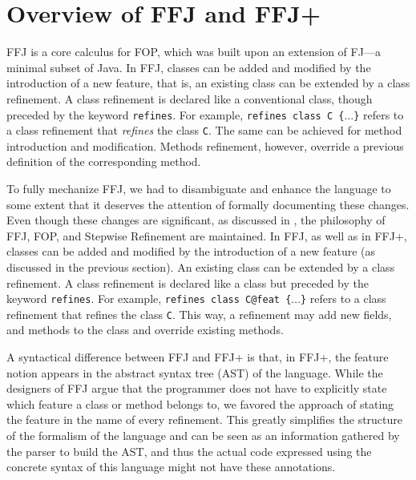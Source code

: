 \chapter{Overview of \gls{FFJ} and \gls{FFJ+}}\label{chap:offj}

\gls{FFJ} is a core calculus for \gls{FOP}, which was built 
upon an extension of \gls{FJ}---a minimal subset of Java. 
In \gls{FFJ}, classes can be added and modified by the 
introduction of a new feature, that is, 
an existing class can be extended by a class refinement. 
A class refinement is declared like a conventional class, though 
preceded by the keyword \texttt{refines}. For example, 
\texttt{refines class C \{$\dots$\}} refers to a class
refinement that
\emph{refines} the class \texttt{C}. The same can be achieved 
for method introduction and modification. Methods refinement,
however, override a previous definition of the corresponding 
method.
 
To fully mechanize \gls{FFJ}, we had to disambiguate and enhance 
the language to some extent that it  deserves the attention of 
formally documenting these changes. 
Even though these changes are significant, as discussed in , 
the philosophy of \gls{FFJ}, \gls{FOP}, and Stepwise Refinement are maintained.
In \gls{FFJ}, as well as in \gls{FFJ+}, classes can be added and 
modified by the introduction of a new feature (as discussed in the previous section).
An existing class can be extended by a class refinement. A class refinement is declared like a class but
preceded by the keyword \texttt{refines}. For example, \texttt{refines class C@feat \{$\dots$\}} refers to a class refinement that
refines the class \texttt{C}. This way, a refinement may add new fields, and methods to the class
and override existing methods.  

A syntactical difference between \gls{FFJ} and \gls{FFJ+} is that, in \gls{FFJ+}, 
the feature notion appears in the abstract syntax tree (AST) of the language.
While the designers of \gls{FFJ} argue that the programmer does not have 
to explicitly state which feature a class or method belongs to, 
we favored the approach of stating the feature in the name of every refinement.
This greatly simplifies the structure of the formalism of the language and can be 
seen as an information gathered by the parser to build the AST, and thus 
the actual code expressed using the concrete syntax of this language 
might not have these annotations.

